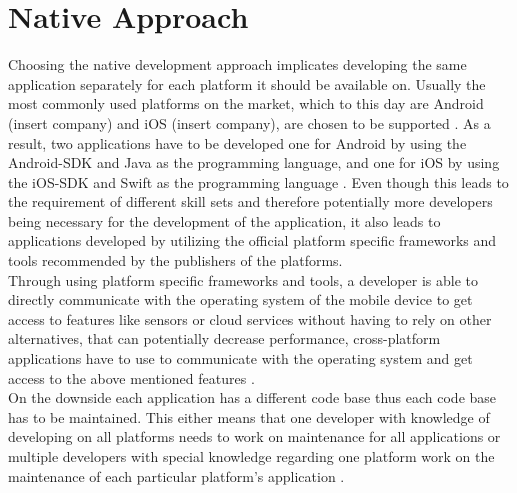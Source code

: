 \documentclass[Bachelor,BIF,english]{twbook}
\begin{document}
\section{Native Approach}
Choosing the native development approach implicates developing the same application separately for each platform it should be available on. Usually the most commonly used platforms on the market, which to this day are Android (insert company) and iOS (insert company), are chosen to be supported \cite[p.~5]{Steczko2016}. As a result, two applications have to be developed one for Android by using the Android-SDK and Java as the programming language, and one for iOS by using the iOS-SDK and Swift as the programming language \cite[p.~5]{LinckArne2016} \cite{AppleGettingStarted}. Even though this leads to the requirement of different skill sets and therefore potentially more developers being necessary for the development of the application, it also leads to applications developed by utilizing the official platform specific frameworks and tools recommended by the publishers of the platforms. 
\\[\baselineskip]
Through using platform specific frameworks and tools, a developer is able to directly communicate with the operating system of the mobile device to get access to features like sensors or cloud services without having to rely on other alternatives, that can potentially decrease performance, cross-platform applications have to use to communicate with the operating system and get access to the above mentioned features \cite[p.~6]{LinckArne2016}.
\\[\baselineskip]
On the downside each application has a different code base thus each code base has to be maintained. This either means that one developer with knowledge of developing on all platforms needs to work on maintenance for all applications or multiple developers with special knowledge regarding one platform work on the maintenance of each particular platform's application \cite[p.~6]{LinckArne2016}.
\end{document}

